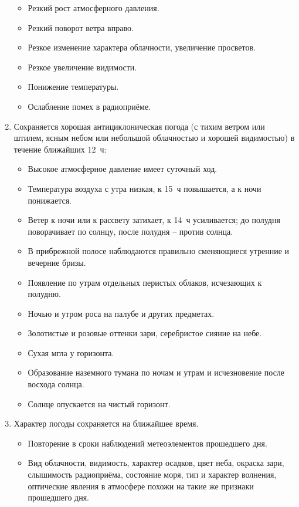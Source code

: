 \begin{enumerate}
\begin{itemize}
  \item Резкий рост атмосферного давления.
  \item Резкий поворот ветра вправо.
  \item Резкое изменение характера облачности, увеличение просветов.
  \item Резкое увеличение видимости.
  \item Понижение температуры.
  \item Ослабление помех в радиоприёме.
  \end{itemize}
\item Сохраняется хорошая антициклоническая погода (с тихим ветром или
  штилем, ясным небом или небольшой облачностью и хорошей видимостью)
  в течение ближайших 12~ч:
  \begin{itemize}
  \item Высокое атмосферное давление имеет суточный ход.
  \item Температура воздуха с утра низкая, к 15~ч повышается, а к ночи понижается.
  \item Ветер к ночи или к рассвету затихает, к 14~ч усиливается; до
    полудня поворачивает по солнцу, после полудня \--- против солнца.
  \item В прибрежной полосе наблюдаются правильно сменяющиеся утренние и вечерние бризы.
  \item Появление по утрам отдельных перистых облаков, исчезающих к полудню.
  \item Ночью и утром роса на палубе и других предметах.
  \item Золотистые и розовые оттенки зари, серебристое сияние на небе.
  \item Сухая мгла у горизонта.
  \item Образование наземного тумана по ночам и утрам и исчезновение
    после восхода солнца.
  \item Солнце опускается на чистый горизонт.
  \end{itemize}
\item Характер погоды сохраняется на ближайшее время.
  \begin{itemize}
  \item Повторение в сроки наблюдений метеоэлементов прошедшего дня.
  \item Вид облачности, видимость, характер осадков, цвет неба,
    окраска зари, слышимость радиоприёма, состояние моря, тип и
    характер волнения, оптические явления в атмосфере похожи на такие
    же признаки прошедшего дня.
  \end{itemize}
\end{enumerate}

